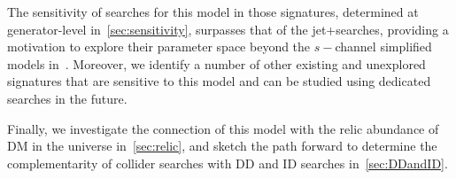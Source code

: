 The sensitivity of searches for this model in those signatures, determined at generator-level in~\autoref{sec:sensitivity}, surpasses that of the jet+\MET searches, providing a motivation to explore their parameter space beyond the $s-$channel simplified models in~\cite{Abercrombie:2015wmb}. Moreover, we identify a number of other existing and unexplored signatures that are sensitive to this model and can be studied using dedicated searches in the future.  

Finally, we investigate the connection of this model with the relic abundance of DM in the universe in~\autoref{sec:relic}, and sketch the path forward to determine the complementarity of collider searches with DD and ID searches in~\autoref{sec:DDandID}. 